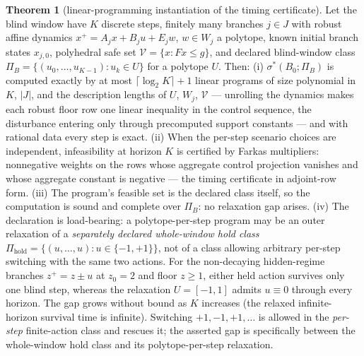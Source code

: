 \documentclass[10pt,twocolumn]{article}
\theoremstyle{definition}
\newtheorem{theorem}{Theorem}
\begin{document}
\begin{theorem}[linear-programming instantiation of the timing certificate]\label{calc-thm:lp-instant}
Let the blind window have \(K\) discrete steps, finitely many branches \(j \in J\) with
robust affine dynamics \(x^{+} = A_{j} x + B_{j} u + E_{j} w\), \(w \in W_{j}\) a polytope,
known initial branch states \(x_{j,0}\), polyhedral safe set \(\mathcal{V} = \{x : Fx \le g\}\),
and declared blind-window class \(\Pi_{B} = \{(u_{0},\dots,u_{K-1}) : u_{k} \in U\}\) for a
polytope \(U\). Then: (i) \(\sigma^{*}(B_{0}; \Pi_{B})\) is computed exactly by at most
\(\lceil \log_{2} K \rceil + 1\) linear programs of size polynomial in \(K\), \(|J|\), and the
description lengths of \(U\), \(W_{j}\), \(\mathcal{V}\) --- unrolling the dynamics makes each
robust floor row one linear inequality in the control sequence, the disturbance entering only
through precomputed support constants --- and with rational data every step is exact.
(ii) When the per-step scenario choices are independent, infeasibility at horizon \(K\) is certified by Farkas multipliers: nonnegative weights on
the rows whose aggregate control projection vanishes and whose aggregate constant is negative
--- the timing certificate in adjoint-row form. (iii) The program's feasible set is the
declared class itself, so the computation is sound and complete over \(\Pi_{B}\): no relaxation
gap arises. (iv) The declaration is load-bearing: a polytope-per-step program may be
an outer relaxation of a \emph{separately declared whole-window hold class}
\(\Pi_{\mathrm{hold}}=\{(u,\dots,u):u\in\{-1,+1\}\}\), not of a
class allowing arbitrary per-step switching with the same two actions.
For the non-decaying hidden-regime branches \(z^+=z\pm u\) at
\(z_0=2\) and floor \(z\ge1\), either held action survives only one
blind step, whereas the relaxation \(U=[-1,1]\) admits \(u\equiv0\)
through every horizon. The gap grows without bound as \(K\) increases
(the relaxed infinite-horizon survival time is infinite). Switching
\(+1,-1,+1,\dots\) is allowed in the \emph{per-step} finite-action
class and rescues it; the asserted gap is specifically between the
whole-window hold class and its polytope-per-step relaxation.
\end{theorem}
\end{document}
